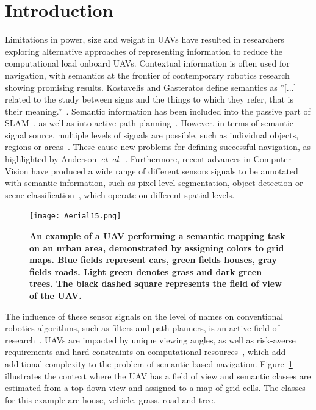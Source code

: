 \documentclass[twocolumn,letterpaper]{IEEEAerospaceCLS}  %
\newcommand{\abbreviation}[1]{\emph{#1}.}
\newcommand{\etal}{\abbreviation{et~al}}
\begin{document}
\section{Introduction} \label{sec:Intro}
Limitations in power, size and weight in UAVs have resulted in researchers exploring alternative approaches of representing information to reduce the computational load onboard UAVs. Contextual information is often used for navigation, with semantics at the frontier of contemporary robotics research showing promising results. Kostavelis and Gasteratos define semantics as ''[...] related to the study between signs and the things to which they refer, that is their meaning.''~\cite{kostavelis_semantic_2015}. Semantic information has been included into the passive part of SLAM~\cite{cadena_past_2016,zhang_hierarchical_2019}, as well as into active path planning~\cite{koch_automatic_2019,alirezaie_exploiting_2017}.  However, in terms of semantic signal source, multiple levels of signals are possible, such as individual objects, regions or areas~\cite{kostavelis_semantic_2015}. These cause new problems for defining successful navigation, as highlighted by Anderson~\etal~\cite{anderson_evaluation_2018}. Furthermore, recent advances in Computer Vision have produced a wide range of different sensors signals to be annotated with semantic information, such as pixel-level segmentation, object detection or scene classification~\cite{alom_history_2018}, which operate on different spatial levels.
\begin{figure}[t]
    \centering
    \texttt{[image: Aerial15.png]}\\
    \caption{\bf{An example of a UAV performing a semantic mapping task on an urban area, demonstrated by assigning colors to grid maps. Blue fields represent cars, green fields houses, gray fields roads. Light green denotes grass and dark green trees. The black dashed square represents the field of view of the UAV.}}
    \label{fig:AerialImg}
\end{figure}
The influence of these sensor signals on the level of names on conventional robotics algorithms, such as filters and path planners, is an active field of research~\cite{kostavelis_semantic_2015,cadena_past_2016,anderson_evaluation_2018}. UAVs are impacted by unique viewing angles, as well as risk-averse requirements and hard constraints on computational resources~\cite{mandel_method_2020,gonzalez_unmanned_2016,boroujerdian_mavbench_2018}, which add additional complexity to the problem of semantic based navigation. Figure~\ref{fig:AerialImg} illustrates the context where the UAV has a field of view and semantic classes are estimated from a top-down view and assigned to a map of grid cells. The classes for this example are house, vehicle, grass, road and tree.  
\end{document}
